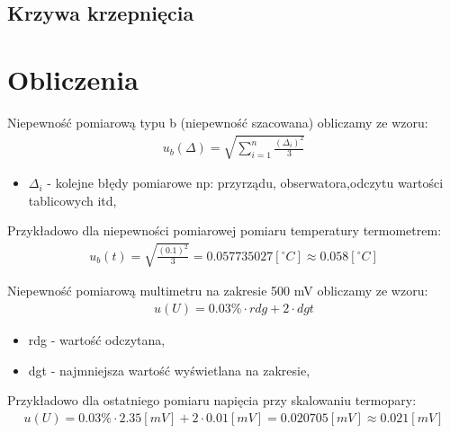 \documentclass[11pt]{article}
\begin{document}
    \subsection*{Krzywa krzepnięcia}
    {\twocolumn

    }
    \onecolumn
    \section{Obliczenia}
    \noindent Niepewność pomiarową typu b (niepewność szacowana) obliczamy ze wzoru:
    \begin{gather*}
        u_b(\Delta)=\sqrt{\sum_{i=1}^{n}\frac{(\Delta_i)^2}{3}}
    \end{gather*}
    {\footnotesize
        \begin{itemize}
            \item[] $\Delta_i$ - kolejne błędy pomiarowe np: przyrządu, obserwatora,odczytu wartości tablicowych itd,
        \end{itemize}}
    \noindent Przykładowo dla niepewności pomiarowej pomiaru temperatury termometrem:
    \begin{gather*}
        u_b(t)=\sqrt{\frac{(0.1)^2}{3}}=0.057735027[^\circ C]\approx 0.058[^\circ C]
    \end{gather*}

    \noindent Niepewność pomiarową multimetru na zakresie 500 mV obliczamy ze wzoru:
    \begin{gather*}
        u(U)=0.03\%\cdot rdg+2\cdot dgt
    \end{gather*}
    {\footnotesize
        \begin{itemize}
            \item[] rdg - wartość odczytana,
            \item[] dgt - najmniejsza wartość wyświetlana na zakresie,
        \end{itemize}}
    \noindent Przykładowo dla ostatniego pomiaru napięcia przy skalowaniu termopary:
    \begin{gather*}
        u(U)=0.03\%\cdot 2.35[mV]+2\cdot 0.01[mV]=0.020705[mV]\approx 0.021[mV]
    \end{gather*}
\end{document}
